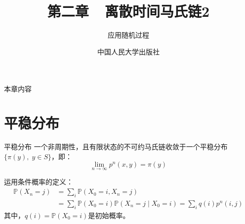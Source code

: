 \documentclass[t]{beamer}
\renewcommand{\Pr}{\mathbb{P}}
\begin{document}
\fontsize{11}{18}\selectfont


\CTEXindent



  \title{第二章~~离散时间马氏链2}
\author{应用随机过程}
\date{中国人民大学出版社}
  \begin{frame}
    \maketitle
  \end{frame}

\begin{frame}{本章内容}
    \begin{multicols}{2}
    \tableofcontents
    \end{multicols}
\end{frame}


\section{平稳分布}
\begin{frame}{平稳分布}
    一个非周期性，且有限状态的不可约马氏链收敛于一个平稳分布$\{\pi(y),\; y\in S\}$，即：
    \[\lim_{n\to\infty}p^n(x,y)= \pi(y) \]

    运用条件概率的定义：
\[\begin{split}
\Pr(X_n=j)&=\sum_i \Pr(X_0=i,X_n=j)\\
&=\sum_i \Pr(X_0=i)\Pr(X_n=j\;|\;X_0=i)
=\sum_i q(i) p^n(i,j)
\end{split} \]
其中，$q(i)=\Pr(X_0=i)$是初始概率。
\end{frame}
\end{document}
